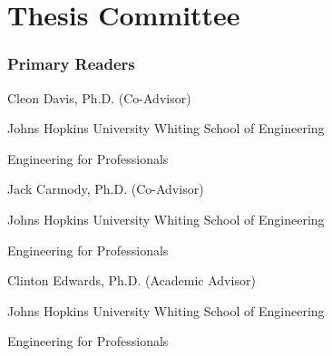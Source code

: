 \chapter*{Thesis Committee}
\subsection*{ Primary Readers}

\begin{singlespace}


\indent Cleon Davis, Ph.D. (Co-Advisor)

\indent \indent Johns Hopkins University Whiting School of Engineering

\indent \indent Engineering for Professionals

\bigskip
\bigskip

\noindent Jack Carmody, Ph.D. (Co-Advisor)

\indent \indent Johns Hopkins University Whiting School of Engineering

\indent \indent Engineering for Professionals

\bigskip
\bigskip


\noindent Clinton Edwards, Ph.D. (Academic Advisor)

\indent \indent Johns Hopkins University Whiting School of Engineering

\indent \indent Engineering for Professionals 


\end{singlespace}

